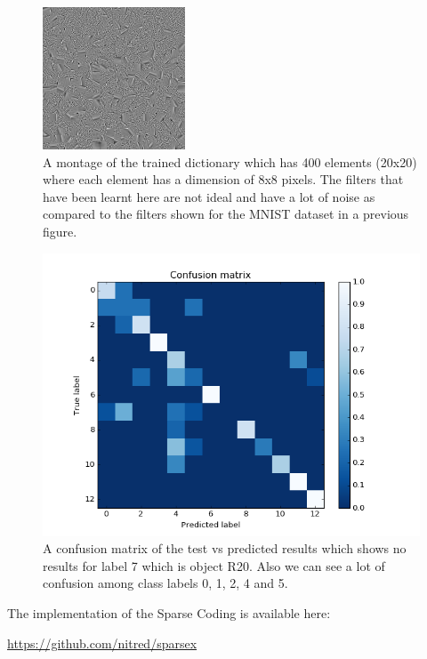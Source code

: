 \documentclass[	DIV=calc,%
				paper=a4,%
				fontsize=11pt,%
				twocolumn]{scrartcl}	 %
\begin{document}
\begin{figure}[H]
    \centering
    \includegraphics[width=0.5\linewidth]{data/sc_data/sc_atwork_dictionary.jpg}
    \caption{A montage of the trained dictionary which has 400 elements (20x20) where each element has a dimension of 8x8 pixels. The filters that have been learnt here are not ideal and have a lot of noise  as compared to the filters shown for the MNIST dataset in a previous figure.}
    \label{sc_atwork_dictionary}
\end{figure}

\begin{figure}[H]
    \centering
    \includegraphics[width=0.8\linewidth]{data/sc_data/sc_atwork_confusion_matrix.png}
    \caption{A confusion matrix of the test vs predicted results which shows no results for label 7 which is object R20. Also we can see a lot of confusion among class labels 0, 1, 2, 4 and 5.}
    \label{sc_atwork_confusion_matrix}
\end{figure}

The implementation of the Sparse Coding is available here: \begin{small}\url{https://github.com/nitred/sparsex}\end{small}
\end{document}
